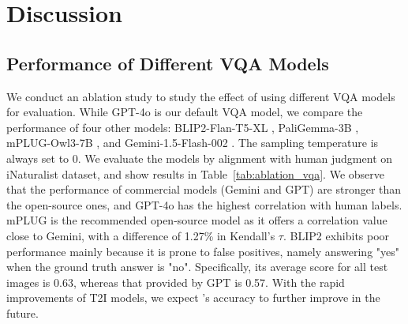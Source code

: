 \section{Discussion}

\subsection{Performance of Different VQA Models}
\label{sec:model}
We conduct an ablation study to study the effect of using different VQA models for \name evaluation. While GPT-4o is our default VQA model, we compare the performance of four other models: BLIP2-Flan-T5-XL \cite{li2023blip}, PaliGemma-3B \cite{steiner2024paligemma}, mPLUG-Owl3-7B \cite{ye2024mplug}, and Gemini-1.5-Flash-002 \cite{team2024gemini}. The sampling temperature is always set to 0. We evaluate the models by alignment with human judgment on iNaturalist dataset, and show results in Table~\ref{tab:ablation_vqa}. We observe that the performance of commercial models (Gemini and GPT) are stronger than the open-source ones, and GPT-4o has the highest correlation with human labels. mPLUG is the recommended open-source model as it offers a correlation value close to Gemini, with a difference of 1.27\% in Kendall's $\tau$. BLIP2 exhibits poor performance mainly because it is prone to false positives, namely answering "yes" when the ground truth answer is "no". Specifically, its average score for all test images is 0.63, whereas that provided by GPT is 0.57. With the rapid improvements of T2I models, we expect \name's accuracy to further improve in the future.

\begin{table}[ht!]
\centering
{}
\caption{Comparison of \name performance using different VQA models, measured by alignment with human judgment on the iNaturalist dataset.}
\label{tab:ablation_vqa}
\end{table}

